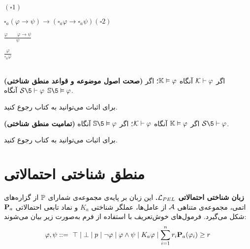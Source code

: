 { }{$(\square 1)$}

{$ \square_a(\varphi\rightarrow\psi)\rightarrow (\square_a\varphi\rightarrow \square_a\psi)  $}{$(\square 2)$}

{$ \displaystyle\frac{\varphi\quad\quad\varphi\rightarrow\psi}{\psi} $}{}

{$ \displaystyle\frac{\varphi}{\square_a\varphi} $}{}
\\ \\
\begin{theorem}\textbf{(صحت اصول موضوعه و قواعد منطق شناختی)}
اگر $ \mathcal{K}\vdash\varphi $ آنگاه $ \mathbb{K}\vDash\varphi $؛ اگر $ \mS\5\vdash\varphi $ آنگاه $ \mbbS\5\vDash\varphi $.
\end{theorem}
\bp
برای اثبات می‌توانید به کتاب \citep{ELMeyer} رجوع کنید.
\ep
\begin{theorem}\textbf{(تمامیت منطق شناختی)}
اگر $ \mathbb{K}\vDash\varphi $ آنگاه $ \mathcal{K}\vdash\varphi $؛ اگر $ \mbbS\5\vDash\varphi $ آنگاه $ \mS\5\vdash\varphi $.
\end{theorem}
\bp
برای اثبات می‌توانید به کتاب \citep{ELMeyer} رجوع کنید.
\ep
\section{منطق شناختی احتمالاتی \texorpdfstring{ }{(PEL)}}

\begin{definition}{\textbf{زبان‌ شناختی احتمالاتی $\mathcal{L}_{PEL}$.}}
این زبان بر پایه‌ی مجموعه‌ی شمارای $ \mathbb{P} $ از گزاره‌های اتمی، مجموعه‌ی متناهی $ \mathcal{A} $ از عامل‌ها، عملگر شناختی $ K_a $ و نماد تابعی احتمالاتی $ \mathbf{P}_a $ شکل می‌گیرد. فرمول‌های خوش‌تعریف با استفاده از فرم  به‌صورت زیر بیان می‌شوند:
\begin{equation*}
\varphi,\psi ::=\ \top\mid\bot\mid p\mid \neg\varphi\mid\varphi\land\psi\mid K_a\varphi\mid \sum_{i=1}^n r_i \mathbf{P}_a(\varphi_i)\geq r
\end{equation*}
\end{definition}